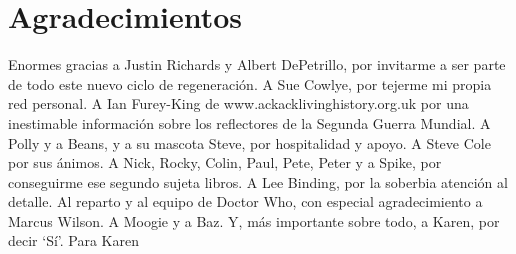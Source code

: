\chapter*{Agradecimientos}

Enormes gracias a Justin Richards y Albert DePetrillo, por invitarme a ser parte de todo este nuevo ciclo de regeneración.
A Sue Cowlye, por tejerme mi propia red personal.
A Ian Furey-King de www.ackacklivinghistory.org.uk por una inestimable información sobre los reflectores de la Segunda Guerra Mundial.
A Polly y a Beans, y a su mascota Steve, por hospitalidad y apoyo.
A Steve Cole por sus ánimos.
A Nick, Rocky, Colin, Paul, Pete, Peter y a Spike, por conseguirme ese segundo sujeta libros.
A Lee Binding, por la soberbia atención al detalle.
Al reparto y al equipo de Doctor Who, con especial agradecimiento a Marcus Wilson.
A Moogie y a Baz.
Y, más importante sobre todo, a Karen, por decir ‘Sí’.
\newpage
Para Karen
